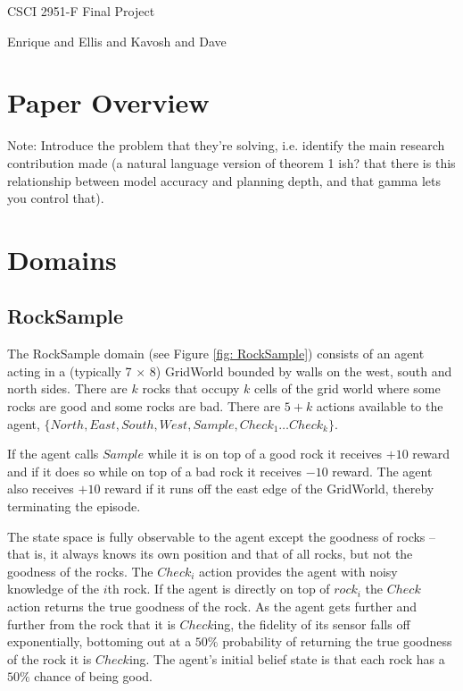 \documentclass[11pt]{article} %
\begin{document}
\centerline{\LARGE{CSCI 2951-F Final Project}}
\centerline{Enrique and Ellis and Kavosh and Dave}
\vspace{2mm}


\section{Paper Overview}

Note: Introduce the problem that they're solving, i.e. identify the main research contribution made (a natural language version of theorem 1 ish? that there is this relationship between model accuracy and planning depth, and that gamma lets you control that).


\section{Domains}

\subsection{RockSample}
\label{sec: rocksample}
The RockSample domain (see Figure \ref{fig: RockSample}) consists of an agent acting in a (typically 7 $\times$ 8) GridWorld bounded by walls on the west, south and north sides. There are $k$ rocks that occupy $k$ cells of the grid world where some rocks are good and some rocks are bad. There are $5+k$ actions available to the agent, $\{North, East, South, West, Sample, Check_1 \ldots Check_k\}$. 

If the agent calls $Sample$ while it is on top of a good rock it receives $+10$ reward and if it does so while on top of a bad rock it receives $-10$ reward. The agent also receives $+10$ reward if it runs off the east edge of the GridWorld, thereby terminating the episode.

The state space is fully observable to the agent except the goodness of rocks -- that is, it always knows its own position and that of all rocks, but not the goodness of the rocks. The $Check_i$ action provides the agent with noisy knowledge of the $i$th rock. If the agent is directly on top of $rock_i$ the $Check$ action returns the true goodness of the rock. As the agent gets further and further from the rock that it is $Check$ing, the fidelity of its sensor falls off exponentially, bottoming out at a $50\%$ probability of returning the true goodness of the rock it is $Check$ing. The agent's initial belief state is that each rock has a $50\%$ chance of being good.
\end{document}
